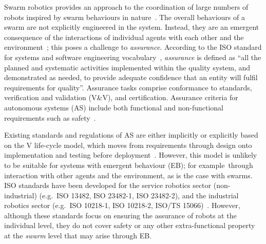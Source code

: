 \documentclass[runningheads]{llncs}
\begin{document}
Swarm robotics provides an approach to the coordination of large numbers of robots inspired by swarm behaviours in nature~\cite{Sahin2005}. 
The overall behaviours of a swarm are not explicitly engineered in the system. Instead, they are an emergent consequence of the interactions of individual agents with each other and the environment~\cite{Abeywickrama2022}; this poses a challenge to \emph{assurance}. 
According to the ISO standard for systems and software engineering vocabulary~\cite{ISO24765:2017}, \emph{assurance} is defined as ``all the planned and systematic activities implemented within the quality system, and demonstrated as needed, to provide adequate confidence that an entity will fulfil requirements for quality''. 
Assurance tasks comprise conformance to standards, verification and validation (V\&V), and certification. Assurance criteria for autonomous systems (AS) include both functional and non-functional requirements such as safety~\cite{Cheng2014}. 

Existing standards and regulations of AS are either implicitly or explicitly based on the V life-cycle model, which moves from requirements through design onto implementation and testing before deployment~\cite{Jia2021}. 
However, this model is unlikely to be suitable for systems with emergent behaviour (EB); for example\ through interaction with other agents and the environment, as is the case with swarms. 
ISO standards have been developed for the service robotics sector (non-industrial) (e.g.\ ISO 13482, ISO 23482-1, ISO 23482-2), and the industrial robotics sector (e.g.\ ISO 10218-1, ISO 10218-2, ISO/TS 15066)~\cite{Abeywickrama2022}. 
However, although these %
standards focus on ensuring the assurance of robots at the individual level, they do not cover safety or any other extra-functional property at the \emph{swarm} level that may arise through EB. %
\end{document}
